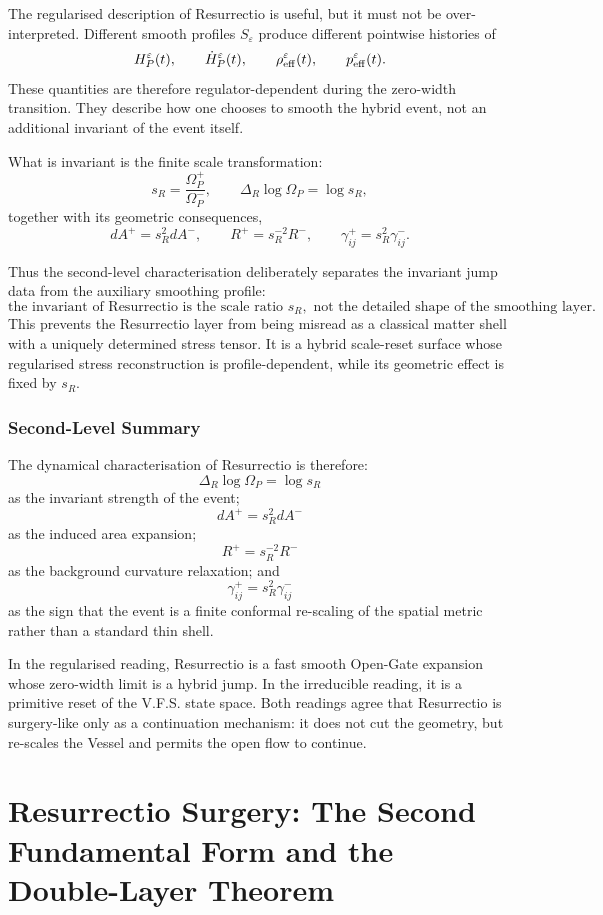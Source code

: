 \documentclass[11pt,a4paper,oneside]{book}
\theoremstyle{plain}
\theoremstyle{definition}
\theoremstyle{remark}
\begin{document}
The regularised description of Resurrectio is useful, but it must not be
over-interpreted. Different smooth profiles \(S_\varepsilon\) produce different
pointwise histories of
\[
H_P^\varepsilon(t),
\qquad
\dot H_P^\varepsilon(t),
\qquad
\rho_{\rm eff}^\varepsilon(t),
\qquad
p_{\rm eff}^\varepsilon(t).
\]
These quantities are therefore regulator-dependent during the zero-width
transition. They describe how one chooses to smooth the hybrid event, not an
additional invariant of the event itself.

What is invariant is the finite scale transformation:
\[
s_R=\frac{\Omega_P^+}{\Omega_P^-},
\qquad
\Delta_R\log\Omega_P=\log s_R,
\]
together with its geometric consequences,
\[
dA^+=s_R^2dA^-,
\qquad
R^+=s_R^{-2}R^-,
\qquad
\gamma^+_{ij}=s_R^2\gamma^-_{ij}.
\]

Thus the second-level characterisation deliberately separates the invariant
jump data from the auxiliary smoothing profile:
\[
\boxed{
\text{the invariant of Resurrectio is the scale ratio }s_R,
\text{ not the detailed shape of the smoothing layer.}
}
\]
This prevents the Resurrectio layer from being misread as a classical matter
shell with a uniquely determined stress tensor. It is a hybrid scale-reset
surface whose regularised stress reconstruction is profile-dependent, while
its geometric effect is fixed by \(s_R\).

\subsection{Second-Level Summary}

The dynamical characterisation of Resurrectio is therefore:
\[
\boxed{
\Delta_R\log\Omega_P=\log s_R
}
\]
as the invariant strength of the event;
\[
\boxed{
dA^+=s_R^2dA^-
}
\]
as the induced area expansion;
\[
\boxed{
R^+=s_R^{-2}R^-
}
\]
as the background curvature relaxation;
and
\[
\boxed{
\gamma^+_{ij}=s_R^2\gamma^-_{ij}
}
\]
as the sign that the event is a finite conformal re-scaling of the spatial
metric rather than a standard thin shell.

In the regularised reading, Resurrectio is a fast smooth Open-Gate expansion
whose zero-width limit is a hybrid jump. In the irreducible reading, it is a
primitive reset of the V.F.S. state space. Both readings agree that
Resurrectio is surgery-like only as a continuation mechanism: it does not cut
the geometry, but re-scales the Vessel and permits the open flow to continue.

\chapter{Resurrectio Surgery: The Second Fundamental Form and the Double-Layer Theorem}
\end{document}
